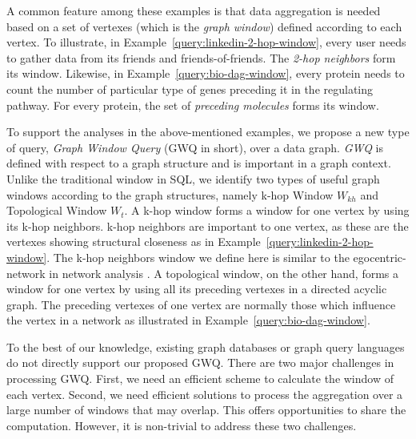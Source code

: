 A common feature among these examples is that data aggregation is needed based on a set of vertexes (which is the {\em graph window}) 
defined according to each vertex.  To illustrate, in Example~\ref{query:linkedin-2-hop-window}, every user needs to gather data from its friends and friends-of-friends. 
The \emph{2-hop neighbors} form its window. Likewise, in Example~\ref{query:bio-dag-window}, every protein needs to count the number of particular type of genes preceding it in the regulating pathway. For every protein, the set of
\emph{preceding molecules} forms its window. 

To support the analyses in the above-mentioned examples, we propose a new 
type of query, \emph{Graph Window Query} (GWQ in short),
over a data graph. \emph{GWQ} is defined with respect to a graph structure 
and is important in a graph context. Unlike the traditional window in SQL, 
we identify two types of useful graph windows according to the 
graph structures, namely k-hop Window $W_{kh}$ and Topological Window $W_t$. 
A k-hop window forms a window for one vertex by using its k-hop neighbors. 
k-hop neighbors are important to one vertex, as these are the vertexes 
showing structural closeness as in Example~\ref{query:linkedin-2-hop-window}. The k-hop neighbors window 
we define here is similar to the egocentric-network in network analysis \cite{burt2009structural} \cite{mondal2014eagr}. A topological window, on the
other hand, forms a window for one vertex by using all its preceding 
vertexes in a directed acyclic graph. The preceding vertexes of one vertex are normally those which influence the vertex in a network as illustrated in Example~\ref{query:bio-dag-window}. 

To the best of our knowledge, existing graph databases or graph query languages do not directly support our proposed GWQ. There are two major challenges in processing GWQ. First, we need an efficient scheme to  calculate the window of each vertex. Second, we need
efficient solutions to process the aggregation over a large number 
of windows that may overlap. This offers opportunities to share the 
computation. However, it is non-trivial to address these two challenges.  

